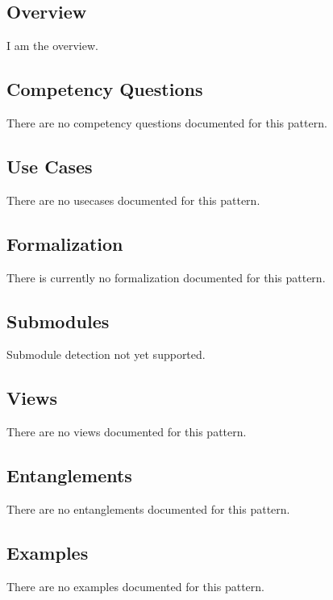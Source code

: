 \subsection{Overview}
\label{ssec:overview}
I am the overview.

\subsection{Competency Questions}
\label{ssec:cqs}
There are no competency questions documented for this pattern.

\subsection{Use Cases}
\label{ssec:use-cases}
There are no usecases documented for this pattern.
\subsection{Formalization}
\label{ssec:formalization}
There is currently no formalization documented for this pattern.

\subsection{Submodules}
\label{ssec:submodules}
Submodule detection not yet supported.

\subsection{Views}
\label{ssec:views}
There are no views documented for this pattern.


\subsection{Entanglements}
\label{ssec:entanglements}
There are no entanglements documented for this pattern.

\subsection{Examples}
\label{ssec:examples}
There are no examples documented for this pattern.

